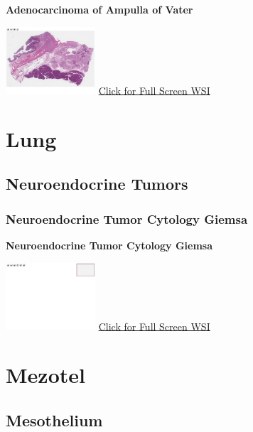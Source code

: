 \documentclass[
  letterpaper,
  paper=6in:9in,
  pagesize=pdftex,
  headinclude=on,
  footinclude=on,
  12pt]{scrbook}
\begin{document}
\textbf{Adenocarcinoma of Ampulla of Vater}

\href{https://images.patolojiatlasi.com/ampullary-adenocarcinoma/HE.html}{\includegraphics[width=0.25\textwidth,height=\textheight]{./screenshots/ampullary-adenocarcinoma_screenshot.png}}
\href{https://images.patolojiatlasi.com/ampullary-adenocarcinoma/HE.html}{Click
for Full Screen WSI}

\part{Lung}

\hypertarget{sec-neuroendocrine-tumors}{%
\chapter{Neuroendocrine Tumors}\label{sec-neuroendocrine-tumors}}

\hypertarget{sec-neuroendocrine-tumor-cytology-giemsa}{%
\section{Neuroendocrine Tumor Cytology
Giemsa}\label{sec-neuroendocrine-tumor-cytology-giemsa}}

\textbf{Neuroendocrine Tumor Cytology Giemsa}

\href{https://images.patolojiatlasi.com/template/HE.html}{\includegraphics[width=0.25\textwidth,height=\textheight]{./screenshots/template_screenshot.png}}
\href{https://images.patolojiatlasi.com/neuroendocrine-cytology/giemsa.html}{Click
for Full Screen WSI}

\part{Mezotel}

\hypertarget{sec-mesothelium}{%
\chapter{Mesothelium}\label{sec-mesothelium}}
\end{document}
